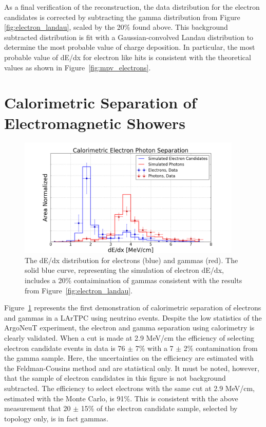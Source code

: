 As a final verification of the reconstruction, the data distribution for the electron candidates is corrected by subtracting the gamma distribution from Figure \ref{fig:electron_landau}, scaled by the 20\% found above.  This background subtracted distribution is fit with a Gaussian-convolved Landau distribution to determine the most probable value of charge deposition.  In particular, the most probable value of dE/dx for electron like hits is consistent with the theoretical values as shown in Figure~\ref{fig:mpv_electrons}.




\FloatBarrier








\section{\label{sec:argo_dedx} Calorimetric Separation of Electromagnetic Showers}

\begin{figure}[p]
  \centering
  \includegraphics[width=0.95\textwidth]{emshower_figures/median_dedx.png}
  \caption[Calorimetric dE/dx Distribution]{The dE/dx distribution for electrons (blue) and gammas (red).  The solid blue curve, representing the simulation of electron dE/dx, includes a 20\% contaimination of gammas consistent with the results from Figure~\ref{fig:electron_landau}.}
  \label{fig:dEdx}
\end{figure}


Figure~\ref{fig:dEdx} represents the first demonstration of calorimetric separation of electrons and gammas in a LArTPC using neutrino events.  Despite the low statistics of the ArgoNeuT experiment, the electron and gamma separation using calorimetry is clearly validated. When a cut is made at 2.9 MeV/cm the efficiency of selecting electron candidate events in data is 76 $\pm$ 7\% with a 7 $\pm$ 2\% contamination from the gamma sample. Here, the uncertainties on the efficiency are estimated with the Feldman-Cousins method \cite{Feldman:1997qc} and are statistical only.  It must be noted, however, that the sample of electron candidates in this figure is not background subtracted.  The efficiency to select electrons with the same cut at 2.9 MeV/cm, estimated with the Monte Carlo, is 91\%.  This is consistent with the above measurement that 20 $\pm$ 15\% of the electron candidate sample, selected by topology only, is in fact gammas.


